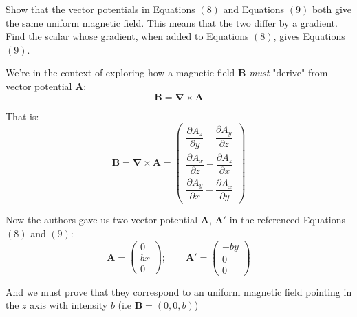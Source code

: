 \documentclass[solutions.tex]{subfiles}
\begin{document}
\maketitle
\begin{exercise}
Show that the vector potentials in Equations $(8)$ and
Equations $(9)$ both give the same uniform magnetic field. This
means that the two differ by a gradient. Find the scalar whose
gradient, when added to Equations $(8)$, gives Equations $(9)$.
\end{exercise}

We're in the context of exploring how a magnetic field $\bm{B}$
\textit{must} "derive" from vector potential $\bm{A}$:
\[
	\bm{B} = \bm\nabla\times\bm{A}
\]

That is:
\[
	\bm{B} = \bm\nabla\times \bm{A} = \begin{pmatrix}
		\dfrac{\partial A_z}{\partial y} - \dfrac{\partial A_y}{\partial z} \\[1em]
		\dfrac{\partial A_x}{\partial z} - \dfrac{\partial A_z}{\partial x} \\[1em]
		\dfrac{\partial A_y}{\partial x} - \dfrac{\partial A_x}{\partial y}
	\end{pmatrix}
\]

Now the authors gave us two vector potential $\bm{A}$, $\bm{A}'$ in the
referenced Equations $(8)$ and $(9)$:
\[
	\bm{A} = \begin{pmatrix}
		0 \\
		b x \\
		0
	\end{pmatrix};\qquad \bm{A}' = \begin{pmatrix}
		-b y \\
		0 \\
		0
	\end{pmatrix}
\]

And we must prove that they correspond to an uniform magnetic field
pointing in the $z$ axis with intensity $b$ (i.e $\bm{B} = (0, 0, b)$)
\end{document}
